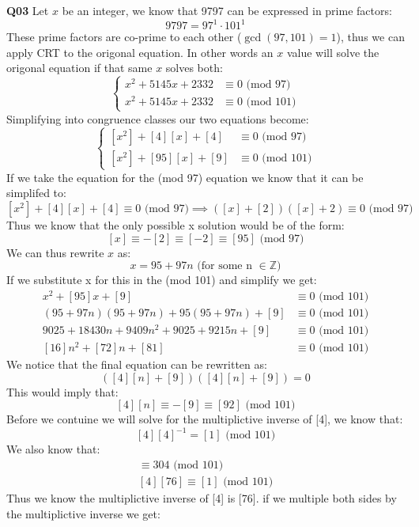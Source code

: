 \documentclass[11pt]{article}
\begin{document}
\parindent=0pt

\textbf{Q03} Let $x$ be an integer, we know that 9797 can be expressed in prime factors:
\[ 9797 = 97^{1} \cdot 101^{1} \]
These prime factors are co-prime to each other ($\gcd(97,101) =1$), thus we can apply CRT to the origonal equation. In other words an $x$ value will solve the origonal equation if that same $x$ solves both:
$$
\begin{cases}
x^2 + 5145x + 2332 & \equiv 0 \text{  (mod 97)} \\
x^2+ 5145x + 2332 & \equiv 0        \text{  (mod 101)}
\end{cases}
$$
Simplifying into congruence classes our two equations become:
$$
\begin{cases}
[x^2] + [4][x] + [4] & \equiv 0 \text{  (mod 97)} \\
[x^2] + [95][x] + [9] & \equiv 0        \text{  (mod 101)}
\end{cases}
$$
If we take the equation for the (mod 97) equation we know that it can be simplifed to:
\[ [x^2] + [4][x] + [4] \equiv 0 \text{  (mod 97)}  \implies ([x] + [2])([x] + 2)  \equiv 0 \text{  (mod 97)} \]
Thus we know that the only possible x solution would be of the form:
\[ [x] \equiv - [2]  \equiv [-2]  \equiv [95]  \text{  (mod 97)} \]
We can thus rewrite $x$ as:
\[ x = 95 + 97n  \text {  (for some n $\in \mathbb{Z}$)} \]
If we substitute x for this in the (mod 101) and simplify we get:
\begin{align*}
  x^2+ [95]x + [9] & \equiv 0        \text{  (mod 101)} \\
 (95 + 97n)(95 + 97n) + 95(95 + 97n) + [9] & \equiv 0   \text{  (mod 101)} \\
9025 + 18430n + 9409n^2 + 9025 + 9215n + [9] & \equiv 0   \text{  (mod 101)} \\
[16]n^2 + [72]n + [81] & \equiv 0   \text{  (mod 101)} 
\end{align*}
We notice that the final equation can be rewritten as:
\[ ([4][n] + [9])([4][n] + [9]) = 0 \]
This would imply that:
\[ [4][n] \equiv - [9] \equiv [92]  \text{  (mod 101)} \]
Before we contuine we will solve for the multiplictive inverse of [4], we know that:
\[ [4][4]^{-1} = [1]  \text{  (mod 101)}  \]
We also know that:
\begin{align*}
  [4][76] \equiv 304 \text{  (mod 101)} \\
  [4][76] \equiv [1] \text{  (mod 101)} 
\end{align*}
Thus we know the multiplictive inverse of [4] is [76]. if we multiple both sides by the multiplictive inverse we get:
\end{document}
